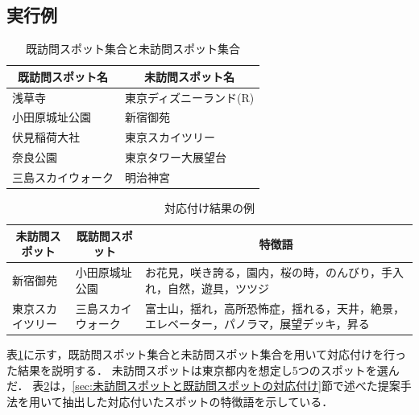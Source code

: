 \documentclass[submit]{ipsj}
\begin{document}
\subsection{実行例}
\label{subsec:実行例}
\begin{table}[t]
  \caption{既訪問スポット集合と未訪問スポット集合}
  \label{table:既訪問スポット集合と未訪問スポット集合}
  \centering
  \begin{tabular}{l|l}
  \hline
  \multicolumn{1}{c|}{既訪問スポット名} & \multicolumn{1}{c}{未訪問スポット名} \\ \hline
  浅草寺                           & 東京ディズニーランド(R)                \\
  小田原城址公園                       & 新宿御苑                         \\
  伏見稲荷大社                        & 東京スカイツリー                     \\
  奈良公園                          & 東京タワー大展望台                    \\
  三島スカイウォーク                     & 明治神宮                         \\ \hline
  \end{tabular}
\end{table}

\begin{table}[t]
  \caption{対応付け結果の例}
  \label{table:対応付け結果の例}
  \centering
  \begin{tabular}{l|l|l}
  \hline
  \multicolumn{1}{c|}{未訪問スポット} & \multicolumn{1}{c|}{既訪問スポット} & \multicolumn{1}{c}{特徴語}                     \\ \hline
  新宿御苑                      & 小田原城址公園                         & お花見，咲き誇る，園内，桜の時，のんびり，手入れ，自然，遊具，ツツジ          \\
  東京スカイツリー                     & 三島スカイウォーク                    & 富士山，揺れ，高所恐怖症，揺れる，天井，絶景，エレベーター，パノラマ，展望デッキ，昇る \\ \hline
  \end{tabular}
\end{table}

表\ref{table:既訪問スポット集合と未訪問スポット集合}に示す，既訪問スポット集合と未訪問スポット集合を用いて対応付けを行った結果を説明する．
未訪問スポットは東京都内を想定し5つのスポットを選んだ．
表\ref{table:対応付け結果の例}は，\ref{sec:未訪問スポットと既訪問スポットの対応付け}節で述べた提案手法を用いて抽出した対応付いたスポットの特徴語を示している．
\end{document}

